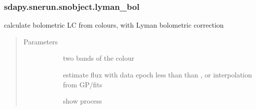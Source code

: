 \documentclass[letterpaper,10pt,english]{sphinxmanual}
\begin{document}
\begin{fulllineitems}
\begin{fulllineitems}
\begin{quote}
\begin{description}
\begin{description}
\end{description}

\end{description}\end{quote}

\end{fulllineitems}



\subsubsection{sdapy.snerun.snobject.lyman\_bol}
\label{\detokenize{generated/sdapy.snerun.snobject.lyman_bol:sdapy-snerun-snobject-lyman-bol}}\label{\detokenize{generated/sdapy.snerun.snobject.lyman_bol::doc}}

\begin{fulllineitems}
\label{\detokenize{generated/sdapy.snerun.snobject.lyman_bol:sdapy.snerun.snobject.lyman_bol}}
calculate bolometric LC from colours, with Lyman bolometric correction
\begin{quote}\begin{description}
\item[{Parameters}] \leavevmode\begin{description}
\item[{}] \leavevmode{[}\sphinxtitleref{list}{]}
two bands of the colour

\item[{}] \leavevmode{[}\sphinxtitleref{str}{]}
estimate flux with data epoch less than than , or interpolation from GP/fits

\item[{}] \leavevmode{[}\sphinxtitleref{bool}{]}
show process

\end{description}

\end{description}\end{quote}




\end{fulllineitems}
\end{fulllineitems}
\end{document}
